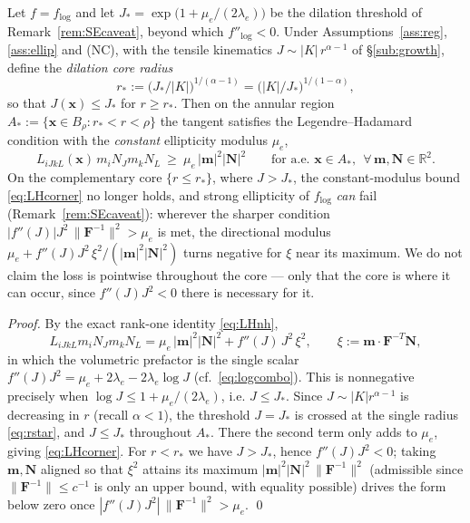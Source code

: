 \begin{lemma}
    \label{lem:Aellip}
    Let $f=f_{\log}$ and let $J_*=\exp\!\big(1+\mu_e/(2\lambda_e)\big)$ be the dilation threshold of
    Remark~\ref{rem:SEcaveat}, beyond which $f''_{\log}<0$. Under Assumptions~\ref{ass:reg}, \ref{ass:ellip} and (NC),
    with the tensile kinematics $J\sim|K|\,r^{\alpha-1}$ of \S\ref{sub:growth}, define the \emph{dilation core radius}
    \begin{equation}
        \label{eq:rstar}
        r_*:=\big(J_*/|K|\big)^{1/(\alpha-1)}=\big(|K|/J_*\big)^{1/(1-\alpha)} ,
    \end{equation}
    so that $J(\bm{x})\le J_*$ for $r\ge r_*$. Then on the annular region $A_*:=\{\bm{x}\in B_\rho: r_*<r<\rho\}$ the
    tangent satisfies the Legendre--Hadamard condition with the \emph{constant} ellipticity modulus $\mu_e$,
    \begin{equation}
        \label{eq:LHcorner}
        L_{iJkL}(\bm{x})\,m_iN_Jm_kN_L \ \ge\ \mu_e\,|\bm{m}|^2|\bm{N}|^2
        \qquad \text{for a.e. } \bm{x}\in A_*,\ \ \forall\,\bm{m},\bm{N}\in\mathbb{R}^2.
    \end{equation}
    On the complementary core $\{r\le r_*\}$, where $J>J_*$, the constant-modulus bound \eqref{eq:LHcorner} no longer
    holds, and strong ellipticity of $f_{\log}$ \emph{can} fail (Remark~\ref{rem:SEcaveat}): wherever the sharper
    condition $|f''(J)|J^2\,\|\bm{F}^{-1}\|^2>\mu_e$ is met, the directional modulus
    $\mu_e+f''(J)J^2\,\xi^2/(|\bm m|^2|\bm N|^2)$ turns negative for $\xi$ near its maximum. We do not claim the loss is
    pointwise throughout the core --- only that the core is where it can occur, since $f''(J)J^2<0$ there is necessary
    for it.
\end{lemma}

\begin{proof}
    By the exact rank-one identity \eqref{eq:LHnh},
    \begin{equation*}
        L_{iJkL}m_iN_Jm_kN_L = \mu_e\,|\bm{m}|^2|\bm{N}|^2 + f''(J)\,J^2\,\xi^2,
        \qquad \xi:=\bm{m}\cdot\bm{F}^{-T}\bm{N},
    \end{equation*}
    in which the volumetric prefactor is the single scalar $f''(J)J^2=\mu_e+2\lambda_e-2\lambda_e\log J$
    (cf.~\eqref{eq:logcombo}). This is nonnegative precisely when $\log J\le 1+\mu_e/(2\lambda_e)$, i.e. $J\le J_*$.
    Since $J\sim|K|r^{\alpha-1}$ is decreasing in $r$ (recall $\alpha<1$), the threshold $J=J_*$ is crossed at the single
    radius \eqref{eq:rstar}, and $J\le J_*$ throughout $A_*$. There the second term only adds to $\mu_e$, giving
    \eqref{eq:LHcorner}. For $r<r_*$ we have $J>J_*$, hence $f''(J)J^2<0$; taking $\bm{m},\bm{N}$ aligned so that
    $\xi^2$ attains its maximum $|\bm{m}|^2|\bm{N}|^2\,\|\bm{F}^{-1}\|^2$ (admissible since $\|\bm{F}^{-1}\|\le c^{-1}$ is
    only an upper bound, with equality possible) drives the form below zero once
    $|f''(J)J^2|\,\|\bm{F}^{-1}\|^2>\mu_e$. \qed
\end{proof}

